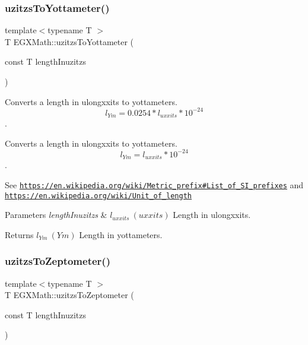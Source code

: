 \subsubsection{\texorpdfstring{uzitzs\+To\+Yottameter()}{uzitzsToYottameter()}}
{\footnotesize\ttfamily template$<$typename T $>$ \\
T E\+G\+X\+Math\+::uzitzs\+To\+Yottameter (\begin{DoxyParamCaption}\item[{const T}]{length\+Inuzitzs }\end{DoxyParamCaption})}



Converts a length in ulongxxits to yottameters. \[ l_{Ym}=0.0254 * l_{uxxits} * 10^{-24} \]. 

Converts a length in ulongxxits to yottameters. \[ l_{Ym}=l_{uxxits} * 10^{-24} \].

See \href{https://en.wikipedia.org/wiki/Metric_prefix#List_of_SI_prefixes}{\tt https\+://en.\+wikipedia.\+org/wiki/\+Metric\+\_\+prefix\#\+List\+\_\+of\+\_\+\+S\+I\+\_\+prefixes} and \href{https://en.wikipedia.org/wiki/Unit_of_length}{\tt https\+://en.\+wikipedia.\+org/wiki/\+Unit\+\_\+of\+\_\+length} 
\begin{DoxyParams}{Parameters}
{\em length\+Inuzitzs} & $ l_{uxxits}\ (uxxits)$ Length in ulongxxits. \\
\hline
\end{DoxyParams}
\begin{DoxyReturn}{Returns}
$ l_{Ym}\ (Ym)$ Length in yottameters. 
\end{DoxyReturn}
\mbox{\label{group___e_g_x_math-_conversions-_length_conversions-_imperial-uzitzs-_s_i_ga9057f57c3f49216e6272c6f0f29ded62}} 
\subsubsection{\texorpdfstring{uzitzs\+To\+Zeptometer()}{uzitzsToZeptometer()}}
{\footnotesize\ttfamily template$<$typename T $>$ \\
T E\+G\+X\+Math\+::uzitzs\+To\+Zeptometer (\begin{DoxyParamCaption}\item[{const T}]{length\+Inuzitzs }\end{DoxyParamCaption})}



